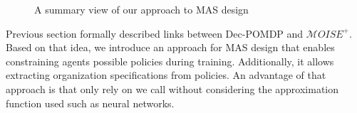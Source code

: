 \documentclass[runningheads]{llncs}
\begin{document}



\begin{figure}[h!]
  \centering
  
  \caption{A summary view of our approach to MAS design}
  \label{fig:design_approach}
\end{figure}

Previous section formally described links between Dec-POMDP and $\mathcal{M}OISE^+$. Based on that idea, we introduce an approach for MAS design that enables constraining agents possible policies during training. Additionally, it allows extracting organization specifications from policies. An advantage of that approach is that only rely on  we call  without considering the approximation function used such as neural networks.
\end{document}
